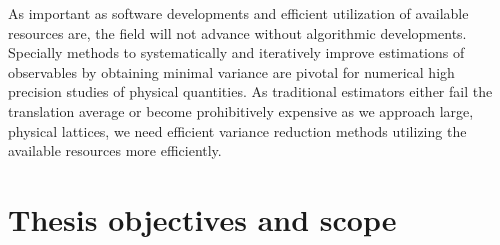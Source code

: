 
As important as software developments and efficient utilization of available resources are, the field will not advance without algorithmic developments.
Specially methods to systematically and iteratively improve estimations of observables by obtaining minimal variance are pivotal for numerical high precision studies of physical quantities.
As traditional estimators either fail the translation average or become prohibitively expensive as we approach large, physical lattices, we need efficient variance reduction methods utilizing the available resources more efficiently.





\section{Thesis objectives and scope}
\label{sec:intro:objectives}

